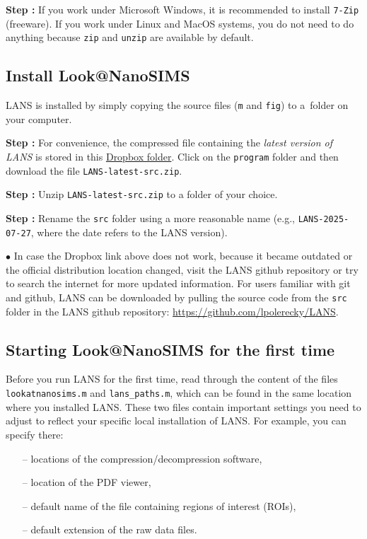 \documentclass[a4paper, 11pt]{article}
\newcommand{\ttt}[1]{\texttt{#1}}
\newcounter{step}
\newcommand\s{\addtocounter{step}{1}\vskip5pt\noindent\textbf{Step \thestep:}{ }}
\newcommand\bul{\vskip5pt\noindent$\bullet${ }}
\begin{document}
\s If you work under Microsoft Windows, it is recommended to install \ttt{7-Zip} (freeware). If you work under Linux and MacOS systems, you do not need to do anything because \ttt{zip} and \ttt{unzip} are available by default.


\subsection{Install Look@NanoSIMS}
\setcounter{step}{0}

LANS is installed by simply copying the source files (\ttt{m} and \ttt{fig}) to a~folder on your computer.

\s For convenience, the compressed file containing the \emph{latest version of LANS} is stored in this \href{https://www.dropbox.com/sh/gyss2uvv5ggu2vl/AABViAmt9WHryEP_xZBrCG_La?dl=0}{Dropbox folder}. Click on the \ttt{program} folder and then download the file \ttt{LANS-latest-src.zip}.

\s Unzip \ttt{LANS-latest-src.zip} to a folder of your choice.

\s Rename the \ttt{src} folder using a more reasonable name (e.g., \ttt{LANS-2025-07-27}, where the date refers to the LANS version).

\bul 
In case the Dropbox link above does not work, because it became outdated or the official distribution location changed, visit the LANS github repository or try to search the internet for more updated information. For users familiar with git and github, LANS can be downloaded by pulling the source code from the \ttt{src} folder in the LANS github repository: \url{https://github.com/lpolerecky/LANS}.


\subsection{Starting Look@NanoSIMS for the first time}
\setcounter{step}{0}

Before you run LANS for the first time, read through the content of the files \ttt{lookatnanosims.m} and \ttt{lans\_paths.m}, which can be found in the same location where you installed LANS. These two files contain important settings you need to adjust to reflect your specific local installation of LANS. For example, you can specify there:

\begin{itemize}
\item[--] locations of the compression/decompression software,
\item[--] location of the PDF viewer,
\item[--] default name of the file containing regions of interest (ROIs),
\item[--] default extension of the raw data files.
\end{itemize}
\end{document}
